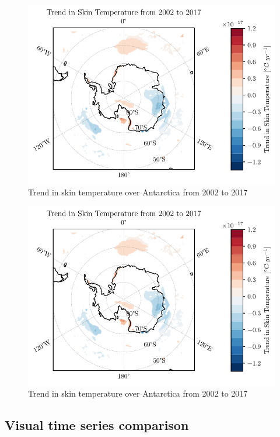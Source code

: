 \documentclass[../main.tex]{subfiles}
\begin{document}
\begin{figure}[!hbt]
    \centering
    \includegraphics{images/2021w5/chapter7/hres/trend_spatial_skt}
    \caption{Trend in skin temperature over Antarctica from 2002 to 2017}
    \label{fig:trend_skt_02_17}
\end{figure}
\begin{figure}[!hbt]
    \centering
    \includegraphics{images/2021w5/chapter7/hres/trend_spatial_skt}
    \caption{Trend in skin temperature over Antarctica from 2002 to 2017}
    \label{fig:trend_skt_02_17}
\end{figure}

\subsection{Visual time series comparison}
\end{document}
